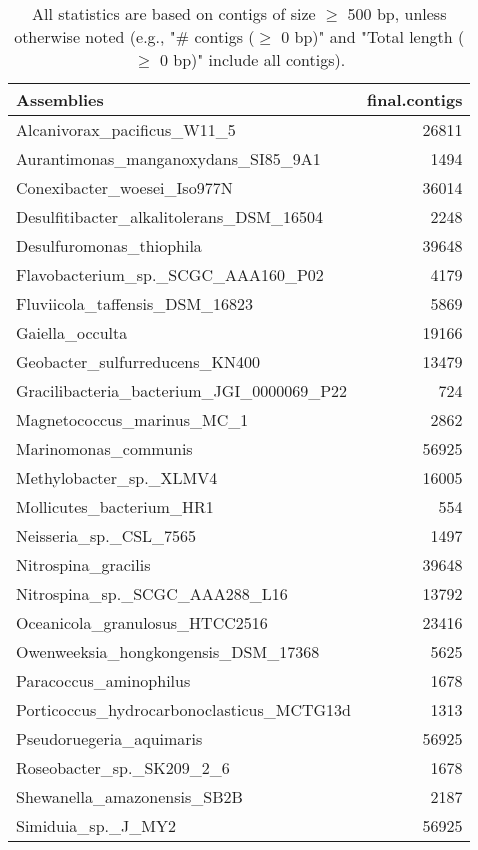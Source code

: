 \documentclass[12pt,a4paper]{article}
\begin{document}
\begin{table}[ht]
\begin{center}
\caption{All statistics are based on contigs of size $\geq$ 500 bp, unless otherwise noted (e.g., "\# contigs ($\geq$ 0 bp)" and "Total length ($\geq$ 0 bp)" include all contigs).}
\begin{tabular}{|l*{1}{|r}|}
\hline
Assemblies & final.contigs \\ \hline
Alcanivorax\_pacificus\_W11\_5 & 26811 \\ \hline
Aurantimonas\_manganoxydans\_SI85\_9A1 & 1494 \\ \hline
Conexibacter\_woesei\_Iso977N & 36014 \\ \hline
Desulfitibacter\_alkalitolerans\_DSM\_16504 & 2248 \\ \hline
Desulfuromonas\_thiophila & 39648 \\ \hline
Flavobacterium\_sp.\_SCGC\_AAA160\_P02 & 4179 \\ \hline
Fluviicola\_taffensis\_DSM\_16823 & 5869 \\ \hline
Gaiella\_occulta & 19166 \\ \hline
Geobacter\_sulfurreducens\_KN400 & 13479 \\ \hline
Gracilibacteria\_bacterium\_JGI\_0000069\_P22 & 724 \\ \hline
Magnetococcus\_marinus\_MC\_1 & 2862 \\ \hline
Marinomonas\_communis & 56925 \\ \hline
Methylobacter\_sp.\_XLMV4 & 16005 \\ \hline
Mollicutes\_bacterium\_HR1 & 554 \\ \hline
Neisseria\_sp.\_CSL\_7565 & 1497 \\ \hline
Nitrospina\_gracilis & 39648 \\ \hline
Nitrospina\_sp.\_SCGC\_AAA288\_L16 & 13792 \\ \hline
Oceanicola\_granulosus\_HTCC2516 & 23416 \\ \hline
Owenweeksia\_hongkongensis\_DSM\_17368 & 5625 \\ \hline
Paracoccus\_aminophilus & 1678 \\ \hline
Porticoccus\_hydrocarbonoclasticus\_MCTG13d & 1313 \\ \hline
Pseudoruegeria\_aquimaris & 56925 \\ \hline
Roseobacter\_sp.\_SK209\_2\_6 & 1678 \\ \hline
Shewanella\_amazonensis\_SB2B & 2187 \\ \hline
Simiduia\_sp.\_J\_MY2 & 56925 \\ \hline

\end{tabular}
\end{center}
\end{table}
\end{document}
